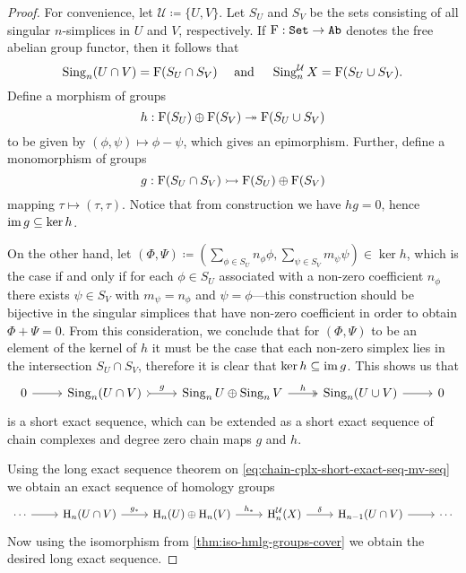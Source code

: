 \begin{proof}
    For convenience, let \(\mathcal{U} \coloneq \{U, V\}\). Let \(S_U\) and \(S_V\) be the sets
    consisting of all singular \(n\)-simplices in \(U\) and \(V\), respectively. If
    \(\operatorname F: {\texttt{Set}} \to {\texttt{Ab}}\) denotes the free abelian group functor, then it
    follows that
    \[
        \operatorname{Sing}_n (U \cap V) = \operatorname F(S_U \cap S_V)
        \quad
        \text{ and }
        \quad
        \operatorname{Sing}_n^{\mathcal{U}} X = \operatorname F(S_U \cup S_V).
    \]
    Define a morphism of groups
    \[
        h: \operatorname F(S_U) \oplus \operatorname F(S_V) \twoheadrightarrow \operatorname F(S_U \cup S_V)
    \]
    to be given by \((\phi, \psi) \mapsto \phi - \psi\), which gives an epimorphism. Further,
    define a monomorphism of groups
    \[
        g: \operatorname F(S_U \cap S_V) \rightarrowtail \operatorname F(S_U) \oplus \operatorname F(S_V)
    \]
    mapping \(\tau \mapsto (\tau, \tau)\). Notice that from construction we have
    \(h g = 0\), hence \(\operatorname{im} g \subseteq \ker h\).

    On the other hand, let
    \((\Phi, \Psi) \coloneq (\sum_{\phi \in S_U} n_{\phi} \phi, \sum_{\psi \in S_{V}} m_{\psi} \psi) \in \ker h\), which is the
    case if and only if for each \(\phi \in S_U\) associated with a non-zero coefficient
    \(n_{\phi}\) there exists \(\psi \in S_V\) with \(m_{\psi} = n_{\phi}\) and
    \(\psi = \phi\)---this construction should be bijective in the singular simplices that
    have non-zero coefficient in order to obtain \(\Phi + \Psi = 0\). From this
    consideration, we conclude that for \((\Phi, \Psi)\) to be an element of the kernel of
    \(h\) it must be the case that each non-zero simplex lies in the intersection
    \(S_U \cap S_V\), therefore it is clear that \(\ker h \subseteq \operatorname{im} g\). This shows us that
    \begin{equation}\label{eq:chain-cplx-short-exact-seq-mv-seq}
        \begin{tikzcd}
            0 \ar[r]
            &\Sing_n(U \cap V)
            \ar[r, tail, "g"]
            &\Sing_n U \oplus \Sing_n V
            \ar[r, two heads, "h"]
            &\Sing_n(U \cup V)
            \ar[r]
            &0
        \end{tikzcd}
    \end{equation}
    is a short exact sequence, which can be extended as a short exact sequence of
    chain complexes and degree zero chain maps \(g\) and \(h\).

    Using the long exact sequence theorem on
    \cref{eq:chain-cplx-short-exact-seq-mv-seq} we obtain an exact sequence of
    homology groups
        {\small
            \[
                \begin{tikzcd}
                    \cdots \ar[r]
                    &\Hmlg_n(U \cap V) \ar[r, "g_{*}"]
                    &\Hmlg_n(U) \oplus \Hmlg_n(V) \ar[r, "h_{*}"]
                    &\Hmlg_n^{\mathcal{U}}(X) \ar[r, "\delta"]
                    &\Hmlg_{n-1}(U \cap V) \ar[r]
                    &\cdots
                \end{tikzcd}
            \]
        }
    Now using the isomorphism from \cref{thm:iso-hmlg-groups-cover} we obtain the
    desired long exact sequence.
\end{proof}

